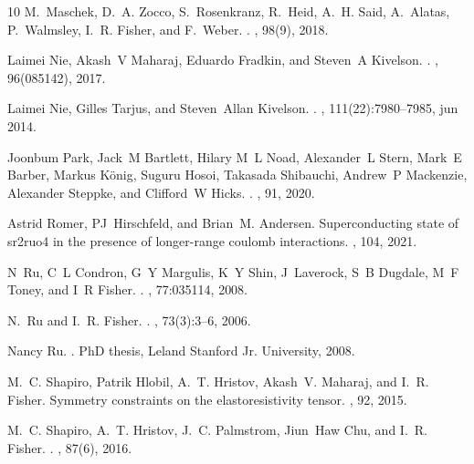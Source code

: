 \documentclass[%
 reprint, %
amsmath,amssymb,
aps,
]{revtex4-2}
\begin{document}
\begin{thebibliography}{10}
M.~Maschek, D.~A. Zocco, S.~Rosenkranz, R.~Heid, A.~H. Said, A.~Alatas,
  P.~Walmsley, I.~R. Fisher, and F.~Weber.
.
, 98(9), 2018.

Laimei Nie, Akash~V Maharaj, Eduardo Fradkin, and Steven~A Kivelson.
.
, 96(085142), 2017.

Laimei Nie, Gilles Tarjus, and Steven~Allan Kivelson.
.
, 111(22):7980--7985, jun 2014.

Joonbum Park, Jack~M Bartlett, Hilary M~L Noad, Alexander~L Stern, Mark~E
  Barber, Markus K{\"{o}}nig, Suguru Hosoi, Takasada Shibauchi, Andrew~P
  Mackenzie, Alexander Steppke, and Clifford~W Hicks.
.
, 91, 2020.

Astrid Romer, PJ~Hirschfeld, and Brian~M. Andersen.
\newblock Superconducting state of sr2ruo4 in the presence of longer-range
  coulomb interactions.
, 104, 2021.

N~Ru, C~L Condron, G~Y Margulis, K~Y Shin, J~Laverock, S~B Dugdale, M~F Toney,
  and I~R Fisher.
.
, 77:035114, 2008.

N.~Ru and I.~R. Fisher.
.
, 73(3):3--6, 2006.

Nancy Ru.
.
\newblock PhD thesis, Leland Stanford Jr. University, 2008.

M.~C. Shapiro, Patrik Hlobil, A.~T. Hristov, Akash~V. Maharaj, and I.~R.
  Fisher.
\newblock Symmetry constraints on the elastoresistivity tensor.
, 92, 2015.

M.~C. Shapiro, A.~T. Hristov, J.~C. Palmstrom, Jiun~Haw Chu, and I.~R. Fisher.
.
, 87(6), 2016.


\end{thebibliography}
\end{document}
